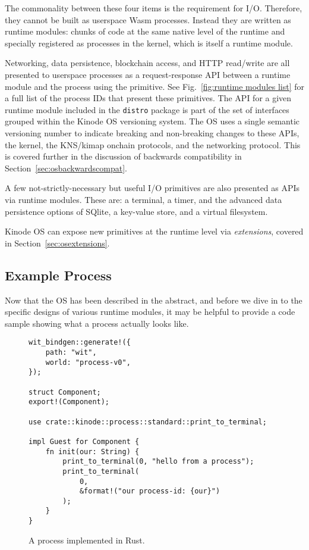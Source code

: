 \documentclass[runningheads]{llncs}
\begin{document}
The commonality between these four items is the requirement for I/O.
Therefore, they cannot be built as userspace Wasm processes.
Instead they are written as runtime modules: chunks of code at the same native level of the runtime and specially registered as processes in the kernel, which is itself a runtime module.

Networking, data persistence, blockchain access, and HTTP read/write are all presented to userspace processes as a request-response API between a runtime module and the process using the primitive.
See Fig.~\ref{fig:runtime modules list} for a full list of the process IDs that present these primitives.
The API for a given runtime module included in the \verb|distro| package is part of the set of interfaces grouped within the Kinode OS versioning system.
The OS uses a single semantic versioning number to indicate breaking and non-breaking changes to these APIs, the kernel, the KNS/kimap onchain protocols, and the networking protocol.
This is covered further in the discussion of backwards compatibility in Section~\ref{sec:osbackwardscompat}.

A few not-strictly-necessary but useful I/O primitives are also presented as APIs via runtime modules.
These are: a terminal, a timer, and the advanced data persistence options of SQlite, a key-value store, and a virtual filesystem.

Kinode OS can expose new primitives at the runtime level via \textit{extensions}, covered in Section~\ref{sec:osextensions}.

\subsection{Example Process}
\label{sec:osexampleprocess}

Now that the OS has been described in the abstract, and before we dive in to the specific designs of various runtime modules, it may be helpful to provide a code sample showing what a process actually looks like.

\begin{figure}[H]
\begin{verbatim}
wit_bindgen::generate!({
    path: "wit",
    world: "process-v0",
});

struct Component;
export!(Component);

use crate::kinode::process::standard::print_to_terminal;

impl Guest for Component {
    fn init(our: String) {
        print_to_terminal(0, "hello from a process");
        print_to_terminal(
            0,
            &format!("our process-id: {our}")
        );
    }
}
\end{verbatim}
    \caption{A process implemented in Rust.}
    \label{fig:example process}
\end{figure}
\end{document}
